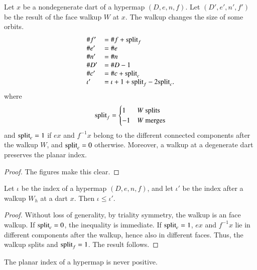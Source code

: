 \begin{lemma} Let $x$ be a nondegenerate dart of a hypermap $(D,e,n,f)$. Let $(D',e',n',f')$ be the result of the face walkup $W$ at $x$.  
The walkup changes the size of some orbits.
    $$
    \begin{array}{lll}
    \# f' &=\# f +{\operatorname{split}}_f  \\  
    \# e'&=\# e \\
    \# n'&=\# n \\
    \# D'&=\# D - 1 \\
    \#c'&=\# c + {\operatorname{split}}_c\\
    \iota' &= \iota + 1+{\operatorname{split}}_f - 2{\operatorname{split}}_c.\\
    \end{array}
    $$
where
   $$
   {\operatorname{split}}_f = \begin{cases}
     1 & W \text{ splits }\\
    -1 & W \text{ merges}\\
   \end{cases}
   $$
and ${\operatorname{split}}_c=1$ if $e x$ and $f^{-1} x$ belong to the different connected components after the walkup $W$, and ${\operatorname{split}}_c=0$ otherwise. Moreover, a walkup at a degenerate dart preserves the planar index.
\end{lemma}

\begin{proof} The figures make this clear.
\end{proof}

\begin{lemma}
Let $\iota$ be the index of a  hypermap $(D,e,n,f)$, and let $\iota'$ be the index after a walkup $W_h$ at a dart $x$.  Then $\iota \le \iota'$.
\end{lemma} 


\begin{proof}  Without loss of generality, by triality symmetry,  the walkup is an face walkup.  If ${\operatorname{split}}_c=0$, the inequality is immediate.  If ${\operatorname{split}}_c=1$, 
$e x$ and $f^{-1} x$ lie in different components after the walkup, hence also in different faces.  Thus, the walkup splits and ${\operatorname{split}}_f = 1$.  The result follows.
\end{proof}


\begin{lemma}  
The planar index
of a hypermap is never positive.
\end{lemma}

